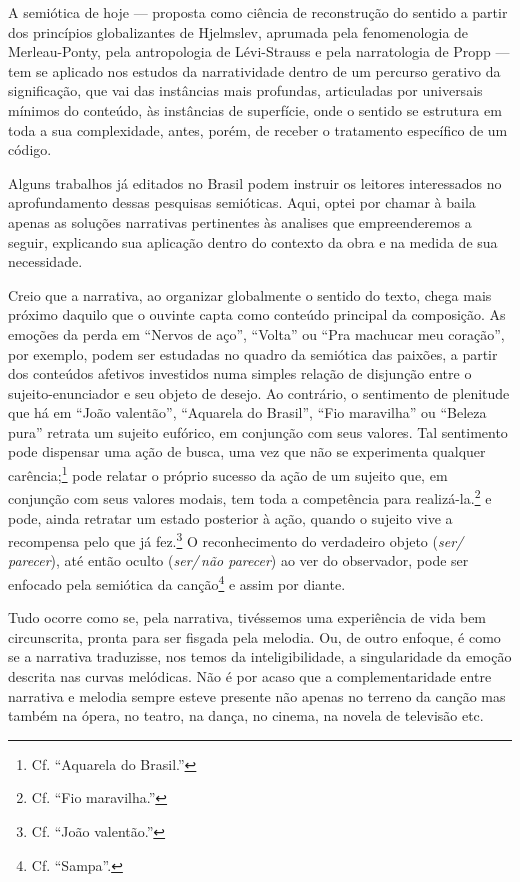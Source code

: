 A semiótica de hoje ---
proposta como ciência de reconstrução do sentido a partir dos princípios
globalizantes de Hjelmslev, aprumada pela fenomenologia de
Merleau-Ponty, pela antropologia de Lévi-Strauss e pela narratologia de
Propp --- tem se aplicado nos estudos da narratividade dentro de um
percurso gerativo da significação, que vai das instâncias mais profundas, articuladas por universais mínimos do conteúdo, às instâncias de
superfície, onde o sentido se estrutura em toda a sua complexidade,
antes, porém, de receber o tratamento específico de um código.

Alguns trabalhos já editados no Brasil podem instruir os leitores
interessados no aprofundamento dessas pesquisas semióticas. Aqui,
optei por chamar à baila apenas as soluções narrativas pertinentes às
analises que empreenderemos a seguir, explicando sua aplicação dentro do
contexto da obra e na medida de sua necessidade.

Creio que a narrativa, ao organizar globalmente o sentido do texto,
chega mais próximo daquilo que o ouvinte capta como conteúdo principal
da composição. As emoções da perda em ``Nervos de aço'', ``Volta'' ou ``Pra
machucar meu coração'', por exemplo, podem ser estudadas no quadro da
semiótica das paixões, a partir dos conteúdos afetivos investidos numa
simples relação de disjunção entre o sujeito-enunciador e seu objeto de
desejo. Ao contrário, o sentimento de plenitude que há em ``João valentão'',
``Aquarela do Brasil'', ``Fio maravilha'' ou ``Beleza pura'' retrata um sujeito
eufórico, em conjunção com seus valores. Tal sentimento pode dispensar
uma ação de busca, uma vez que não se experimenta qualquer carência;\footnote{Cf. ``Aquarela do Brasil.''} pode relatar o próprio sucesso da ação de um
sujeito que, em conjunção com seus valores modais, tem toda a
competência para realizá-la.\footnote{Cf. ``Fio maravilha.''} e pode, ainda retratar
um estado posterior à ação, quando o sujeito vive a recompensa pelo que
já fez.\footnote{Cf. ``João valentão.''} O reconhecimento do verdadeiro objeto
(\textit{ser/\,parecer}), até então oculto (\textit{ser/\,não parecer}) ao ver do observador,
pode ser enfocado pela semiótica da canção\footnote{Cf. ``Sampa''.} e assim por
diante.

Tudo ocorre como se, pela narrativa, tivéssemos uma experiência de vida
bem circunscrita, pronta para ser fisgada pela melodia. Ou, de outro
enfoque, é como se a narrativa traduzisse, nos temos da
inteligibilidade, a singularidade da emoção descrita nas curvas
melódicas. Não é por acaso que a complementaridade entre narrativa e
melodia sempre esteve presente não apenas no terreno da canção mas
também na ópera, no teatro, na dança, no cinema, na novela de televisão
etc.

